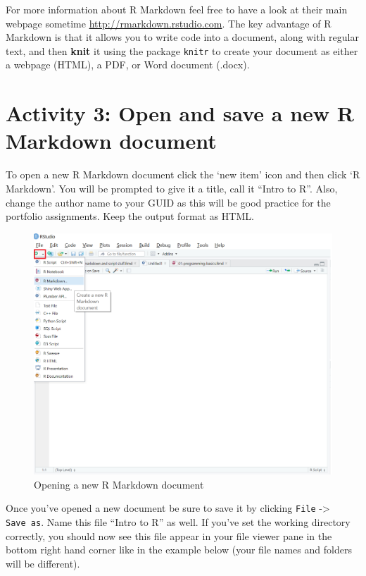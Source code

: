 \documentclass[]{book}
\begin{document}
For more information about R Markdown feel free to have a look at their main webpage sometime \url{http://rmarkdown.rstudio.com}. The key advantage of R Markdown is that it allows you to write code into a document, along with regular text, and then \textbf{knit} it using the package \texttt{knitr} to create your document as either a webpage (HTML), a PDF, or Word document (.docx).

\hypertarget{activity-3-open-and-save-a-new-r-markdown-document}{%
\section{Activity 3: Open and save a new R Markdown document}\label{activity-3-open-and-save-a-new-r-markdown-document}}

To open a new R Markdown document click the `new item' icon and then click `R Markdown'. You will be prompted to give it a title, call it ``Intro to R''. Also, change the author name to your GUID as this will be good practice for the portfolio assignments. Keep the output format as HTML.

\begin{figure}

{\centering \includegraphics[width=1\linewidth]{images/new-markdown} 

}

\caption{Opening a new R Markdown document}\label{fig:img-new-markdown}
\end{figure}

Once you've opened a new document be sure to save it by clicking \texttt{File} -\textgreater{} \texttt{Save\ as}. Name this file ``Intro to R'' as well. If you've set the working directory correctly, you should now see this file appear in your file viewer pane in the bottom right hand corner like in the example below (your file names and folders will be different).
\end{document}
